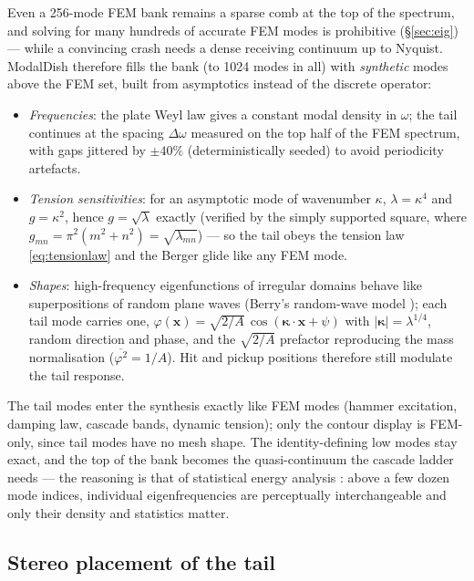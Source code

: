 \documentclass[11pt,a4paper]{article}
\begin{document}
Even a 256-mode FEM bank remains a sparse comb at the top of the
spectrum, and solving for many hundreds of accurate FEM modes is
prohibitive (\S\ref{sec:eig}) --- while a convincing crash needs a dense
receiving continuum up to Nyquist. ModalDish therefore fills the bank
(to 1024 modes in all) with \emph{synthetic} modes above the FEM set,
built from asymptotics instead of the discrete operator:
%
\begin{itemize}
\item \emph{Frequencies}: the plate Weyl law gives a constant modal
  density in $\omega$; the tail continues at the spacing
  $\Delta\omega$ measured on the top half of the FEM spectrum, with
  gaps jittered by $\pm 40\%$ (deterministically seeded) to avoid
  periodicity artefacts.
\item \emph{Tension sensitivities}: for an asymptotic mode of wavenumber
  $\kappa$, $\lambda = \kappa^4$ and $g = \kappa^2$, hence
  $g = \sqrt{\lambda}$ exactly (verified by the simply supported square,
  where $g_{mn} = \pi^2(m^2{+}n^2) = \sqrt{\lambda_{mn}}$) --- so the
  tail obeys the tension law \eqref{eq:tensionlaw} and the Berger glide
  like any FEM mode.
\item \emph{Shapes}: high-frequency eigenfunctions of irregular domains
  behave like superpositions of random plane waves (Berry's random-wave
  model \cite{berry}); each tail mode carries one,
  $\varphi(\bm{x}) = \sqrt{2/A}\, \cos(\bm{\kappa}\cdot\bm{x} + \psi)$
  with $|\bm{\kappa}| = \lambda^{1/4}$, random direction and phase, and
  the $\sqrt{2/A}$ prefactor reproducing the mass normalisation
  ($\overline{\varphi^2} = 1/A$). Hit and pickup positions therefore
  still modulate the tail response.
\end{itemize}
%
The tail modes enter the synthesis exactly like FEM modes (hammer
excitation, damping law, cascade bands, dynamic tension); only the
contour display is FEM-only, since tail modes have no mesh shape. The
identity-defining low modes stay exact, and the top of the bank becomes
the quasi-continuum the cascade ladder needs --- the reasoning is that of
statistical energy analysis \cite{lyon}: above a few dozen mode indices,
individual eigenfrequencies are perceptually interchangeable and only
their density and statistics matter.

\subsection{Stereo placement of the tail}
\label{sec:tailspread}
\end{document}
